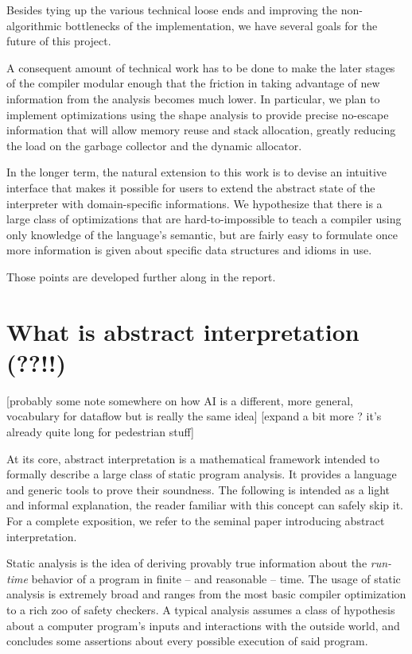 \documentclass[11pt]{article}
\begin{document}
Besides tying up the various technical loose ends and improving the non-algorithmic bottlenecks of the implementation, we have several goals for the future of this project.

A consequent amount of technical work has to be done to make the later stages of the compiler modular enough that the friction in taking advantage of new information from the analysis becomes much lower. In particular, we plan to implement optimizations using the shape analysis to provide precise no-escape information that will allow memory reuse and stack allocation, greatly reducing the load on the garbage collector and the dynamic allocator.

In the longer term, the natural extension to this work is to devise an intuitive interface that makes it possible for users to extend the abstract state of the interpreter with domain-specific informations. We hypothesize that there is a large class of optimizations that are hard-to-impossible to teach a compiler using only knowledge of the language's semantic, but are fairly easy to formulate once more information is given about specific data structures and idioms in use.

Those points are developed further along in the report.

\break

\section*{What is abstract interpretation (??!!)}

[probably some note somewhere on how AI is a different, more general, vocabulary for dataflow but is really the same idea]
[expand a bit more ? it's already quite long for pedestrian stuff]


At its core, abstract interpretation is a mathematical framework intended to formally describe a large class of static program analysis.
It provides a language and generic tools to prove their soundness.
The following is intended as a light and informal explanation, the reader familiar with this concept can safely skip it. For a complete exposition, we refer to the seminal paper introducing abstract interpretation\cite{absint-cousot}.

Static analysis is the idea of deriving provably true information about the \emph{run-time} behavior of a program in finite -- and reasonable -- time.
The usage of static analysis is extremely broad and ranges from the most basic compiler optimization to a rich zoo of safety checkers.
A typical analysis assumes a class of hypothesis about a computer program's inputs and interactions with the outside world, and concludes some assertions
about every possible execution of said program.
\end{document}
